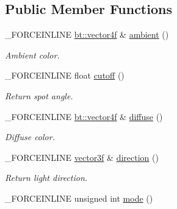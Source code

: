 \subsection*{Public Member Functions}
\begin{DoxyCompactItemize}
\item 
\hypertarget{classcsad_1_1_light_add5b8529c6d817ca14c9755ceaac6431}{\-\_\-\-F\-O\-R\-C\-E\-I\-N\-L\-I\-N\-E \hyperlink{classbt_1_1vector4f}{bt\-::vector4f} \& \hyperlink{classcsad_1_1_light_add5b8529c6d817ca14c9755ceaac6431}{ambient} ()}\label{classcsad_1_1_light_add5b8529c6d817ca14c9755ceaac6431}

\begin{DoxyCompactList}\small\item\em Ambient color. \end{DoxyCompactList}\item 
\hypertarget{classcsad_1_1_light_a9ec793f32b7e8a68f192c42e5289f7af}{\-\_\-\-F\-O\-R\-C\-E\-I\-N\-L\-I\-N\-E float \hyperlink{classcsad_1_1_light_a9ec793f32b7e8a68f192c42e5289f7af}{cutoff} ()}\label{classcsad_1_1_light_a9ec793f32b7e8a68f192c42e5289f7af}

\begin{DoxyCompactList}\small\item\em Return spot angle. \end{DoxyCompactList}\item 
\hypertarget{classcsad_1_1_light_a795de37f7b9287238560687ba3e37d62}{\-\_\-\-F\-O\-R\-C\-E\-I\-N\-L\-I\-N\-E \hyperlink{classbt_1_1vector4f}{bt\-::vector4f} \& \hyperlink{classcsad_1_1_light_a795de37f7b9287238560687ba3e37d62}{diffuse} ()}\label{classcsad_1_1_light_a795de37f7b9287238560687ba3e37d62}

\begin{DoxyCompactList}\small\item\em Diffuse color. \end{DoxyCompactList}\item 
\hypertarget{classcsad_1_1_light_ac0360f1db06e5f1027a0a42d8b9e7ac1}{\-\_\-\-F\-O\-R\-C\-E\-I\-N\-L\-I\-N\-E \hyperlink{classbt_1_1vector3f}{vector3f} \& \hyperlink{classcsad_1_1_light_ac0360f1db06e5f1027a0a42d8b9e7ac1}{direction} ()}\label{classcsad_1_1_light_ac0360f1db06e5f1027a0a42d8b9e7ac1}

\begin{DoxyCompactList}\small\item\em Return light direction. \end{DoxyCompactList}\item 
\hypertarget{classcsad_1_1_light_a4fc5e4e222d852a082cb32dddcab3c8b}{\-\_\-\-F\-O\-R\-C\-E\-I\-N\-L\-I\-N\-E unsigned int \hyperlink{classcsad_1_1_light_a4fc5e4e222d852a082cb32dddcab3c8b}{mode} ()}\label{classcsad_1_1_light_a4fc5e4e222d852a082cb32dddcab3c8b}


\end{DoxyCompactItemize}
